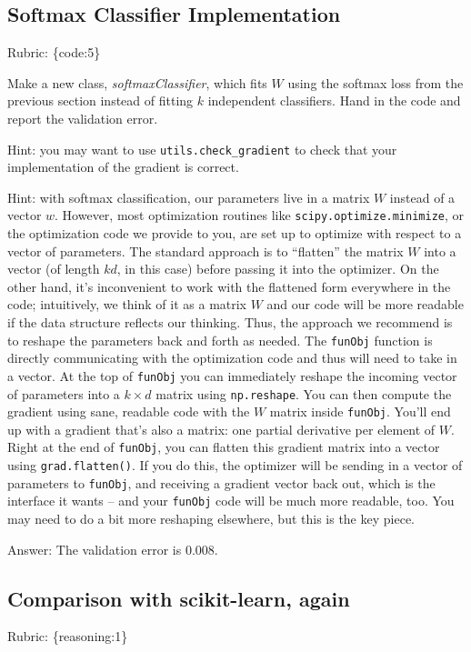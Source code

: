 \documentclass{article}
\def\rubric#1{\gre{Rubric: \{#1\}}}{}
\def\blu#1{{\color{blu}#1}}
\def\gre#1{{\color{gre}#1}}
\begin{document}
\subsection{Softmax Classifier Implementation}
\rubric{code:5}

Make a new class, \emph{softmaxClassifier}, which fits $W$ using the softmax loss from the previous section instead of fitting $k$ independent classifiers. \blu{Hand in the code and report the validation error}.

Hint: you may want to use \verb|utils.check_gradient| to check that your implementation of the gradient is correct.

Hint: with softmax classification, our parameters live in a matrix $W$ instead of a vector $w$. However, most optimization routines like \texttt{scipy.optimize.minimize}, or the optimization code we provide to you, are set up to optimize with respect to a vector of parameters. The standard approach is to ``flatten'' the matrix $W$ into a vector (of length $kd$, in this case) before passing it into the optimizer. On the other hand, it's inconvenient to work with the flattened form everywhere in the code; intuitively, we think of it as a matrix $W$ and our code will be more readable if the data structure reflects our thinking. Thus, the approach we recommend is to reshape the parameters back and forth as needed. The \texttt{funObj} function is directly communicating with the optimization code and thus will need to take in a vector. At the top of \texttt{funObj} you can immediately reshape the incoming vector of parameters into a $k \times d$ matrix using \texttt{np.reshape}. You can then compute the gradient using sane, readable code with the $W$ matrix inside \texttt{funObj}. You'll end up with a gradient that's also a matrix: one partial derivative per element of $W$. Right at the end of \texttt{funObj}, you can flatten this gradient matrix into a vector using \texttt{grad.flatten()}. If you do this, the optimizer will be sending in a vector of parameters to \texttt{funObj}, and receiving a gradient vector back out, which is the interface it wants -- and your \texttt{funObj} code will be much more readable, too. You may need to do a bit more reshaping elsewhere, but this is the key piece.

\gre{
Answer: The validation error is $0.008$.
}

\subsection{Comparison with scikit-learn, again}
\rubric{reasoning:1}
\end{document}
